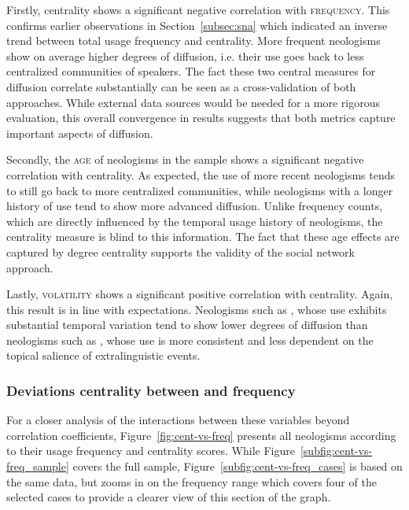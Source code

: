 \documentclass[
  a4paper,
  abstract=on,
  captions=tableabove
  ]{scrartcl}
\begin{document}
      Firstly, centrality shows a significant negative correlation with \textsc{frequency}. This confirms earlier observations in Section~\ref{subsec:sna} which indicated an inverse trend between total usage frequency and centrality. More frequent neologisms show on average higher degrees of diffusion, i.e. their use goes back to less centralized communities of speakers. The fact these two central measures for diffusion correlate substantially can be seen as a cross-validation of both approaches. While external data sources would be needed for a more rigorous evaluation, this overall convergence in results suggests that both metrics capture important aspects of diffusion.

      Secondly, the \textsc{age} of neologisms in the sample shows a significant negative correlation with centrality. As expected, the use of more recent neologisms tends to still go back to more centralized communities, while neologisms with a longer history of use tend to show more advanced diffusion. Unlike frequency counts, which are directly influenced by the temporal usage history of neologisms, the centrality measure is blind to this information. The fact that these age effects are captured by degree centrality supports the validity of the social network approach.

      Lastly, \textsc{volatility} shows a significant positive correlation with centrality. Again, this result is in line with expectations. Neologisms such as , whose use exhibits substantial temporal variation tend to show lower degrees of diffusion than neologisms such as , whose use is more consistent and less dependent on the topical salience of extralinguistic events.

    \subsubsection{Deviations centrality between and frequency}
      \label{subsec:cent-vs-freq_deviations}

      For a closer analysis of the interactions between these variables beyond correlation coefficients, Figure~\ref{fig:cent-vs-freq} presents all neologisms according to their usage frequency and centrality scores. While Figure~\ref{subfig:cent-vs-freq_sample} covers the full sample, Figure~\ref{subfig:cent-vs-freq_cases} is based on the same data, but zooms in on the frequency range which covers four of the selected cases to provide a clearer view of this section of the graph.
\end{document}
